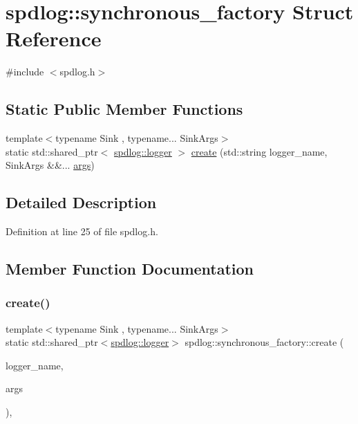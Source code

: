 \hypertarget{structspdlog_1_1synchronous__factory}{}\section{spdlog\+:\+:synchronous\+\_\+factory Struct Reference}
\label{structspdlog_1_1synchronous__factory}


{\ttfamily \#include $<$spdlog.\+h$>$}

\subsection*{Static Public Member Functions}
\begin{DoxyCompactItemize}
\item 
{\footnotesize template$<$typename Sink , typename... Sink\+Args$>$ }\\static std\+::shared\+\_\+ptr$<$ \hyperlink{classspdlog_1_1logger}{spdlog\+::logger} $>$ \hyperlink{structspdlog_1_1synchronous__factory_acde09e4f9f33281ab1e663de5ef703b5}{create} (std\+::string logger\+\_\+name, Sink\+Args \&\&... \hyperlink{printf_8h_a47047b7b28fd1342eef756b79c778580}{args})
\end{DoxyCompactItemize}


\subsection{Detailed Description}


Definition at line 25 of file spdlog.\+h.



\subsection{Member Function Documentation}
\mbox{\label{structspdlog_1_1synchronous__factory_acde09e4f9f33281ab1e663de5ef703b5}} 
\subsubsection{\texorpdfstring{create()}{create()}}
{\footnotesize\ttfamily template$<$typename Sink , typename... Sink\+Args$>$ \\
static std\+::shared\+\_\+ptr$<$\hyperlink{classspdlog_1_1logger}{spdlog\+::logger}$>$ spdlog\+::synchronous\+\_\+factory\+::create (\begin{DoxyParamCaption}\item[{std\+::string}]{logger\+\_\+name,  }\item[{Sink\+Args \&\&...}]{args }\end{DoxyParamCaption})\hspace{0.3cm}{\ttfamily [inline]}, {\ttfamily [static]}}



